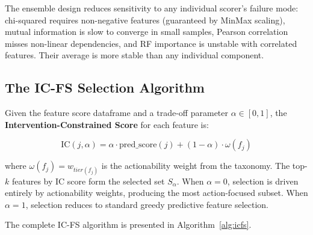 \documentclass[a4paper,fleqn]{cas-sc}
\begin{document}
The ensemble design reduces sensitivity to any individual scorer's failure mode: chi-squared requires non-negative features (guaranteed by MinMax scaling), mutual information is slow to converge in small samples, Pearson correlation misses non-linear dependencies, and RF importance is unstable with correlated features. Their average is more stable than any individual component.

\subsection{The IC-FS Selection Algorithm}

Given the feature score dataframe and a trade-off parameter $\alpha \in [0,1]$, the \textbf{Intervention-Constrained Score} for each feature is:

\begin{equation}
    \text{IC}(j, \alpha) = \alpha \cdot \text{pred\_score}(j) + (1-\alpha) \cdot \omega(f_j)
\end{equation}

where $\omega(f_j) = w_{tier(f_j)}$ is the actionability weight from the taxonomy. The top-$k$ features by IC score form the selected set $S_\alpha$. When $\alpha = 0$, selection is driven entirely by actionability weights, producing the most action-focused subset. When $\alpha = 1$, selection reduces to standard greedy predictive feature selection.

The complete IC-FS algorithm is presented in Algorithm~\ref{alg:icfs}.
\end{document}
